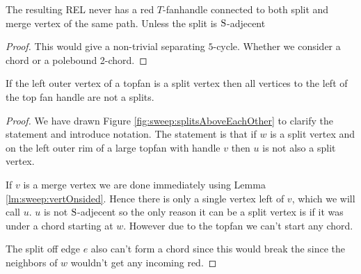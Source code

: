     \begin{lemma}
      \label{lm:uni:noTfan above whole path}
      The resulting REL never has a red $T$-fanhandle connected to both split and merge vertex of the same path. Unless the split is $\mathrm{S}$-adjecent
    \end{lemma}
    \begin{proof}
        This would give a non-trivial separating $5$-cycle. Whether we consider a chord or a polebound 2-chord.
    \end{proof}

    \begin{lemma}
      \label{lm:sweep:NoTwoSplitsAboveEachOther}
      If the left outer vertex of a topfan is a split vertex then all vertices to the left of the top fan handle are not a splits.
    \end{lemma}

    \begin{proof}
      We have drawn Figure \ref{fig:sweep:splitsAboveEachOther} to clarify the statement and introduce notation. The statement is that if $w$ is a split vertex and on the left outer rim of a large topfan with handle $v$ then $u$ is not also a split vertex.

      If $v$ is a merge vertex we are done immediately using Lemma \ref{lm:sweep:vertOnsided}. Hence there is only a single vertex left of $v$, which we will call $u$. $u$ is not $\mathrm{S}$-adjecent so the only reason it can be a split vertex is if it was under a chord starting at $w$. However due to the topfan we can't start any chord.

      The split off edge $e$ also can't form a chord since this would break the \rel since the neighbors of $w$ wouldn't get any incoming red.
    \end{proof}


